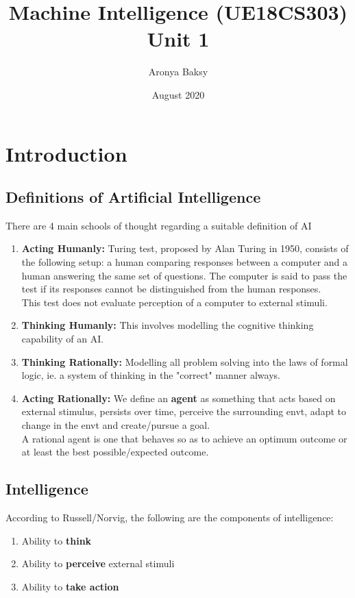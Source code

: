 \documentclass{article}
\title{Machine Intelligence (UE18CS303) \\
\large Unit 1}
\author{Aronya Baksy}
\date{August 2020}
\theoremstyle{plain}
\theoremstyle{definition}
\begin{document}
\maketitle

\section{Introduction}

\subsection{Definitions of Artificial Intelligence}

There are 4 main schools of thought regarding a suitable definition of AI

\begin{enumerate}
    \item \textbf{Acting Humanly:} Turing test, proposed by Alan Turing in 1950, consists of the following setup: a human comparing responses between a computer and a human answering the same set of questions. The computer is said to pass the test if its responses cannot be distinguished from the human responses.\\
    This test does not evaluate perception of a computer to external stimuli.
    
    \item \textbf{Thinking Humanly:} This involves modelling the cognitive thinking capability of an AI.
    
    \item \textbf{Thinking Rationally:} Modelling all problem solving into the laws of formal logic, ie. a system of thinking in the "correct" manner always. 
    
    \item \textbf{Acting Rationally:} We define an \textbf{agent} as something that acts based on external stimulus, persists over time, perceive the surrounding envt, adapt to change in the envt and create/pursue a goal.\\
    A rational agent is one that behaves so as to achieve an optimum outcome or at least the best possible/expected outcome.
\end{enumerate}

\subsection{Intelligence}
    According to Russell/Norvig, the following are the components of intelligence:
    \begin{enumerate}
        \item Ability to \textbf{think}
        
        \item Ability to \textbf{perceive} external stimuli
        
        \item Ability to \textbf{take action}
    \end{enumerate}
\end{document}
